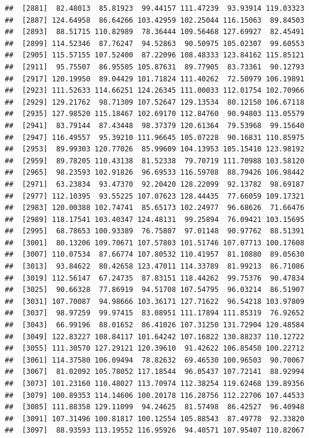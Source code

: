 \documentclass[
]{article}
\begin{document}
\begin{verbatim}
##  [2881]  82.48013  85.81923  99.44157 111.47239  93.93914 119.03323
##  [2887] 124.64958  86.64266 103.42959 102.25044 116.15063  89.84503
##  [2893]  88.51715 110.82989  78.36444 109.56468 127.69927  82.45491
##  [2899] 114.52346  87.76247  94.52863  90.50975 105.02307  99.60553
##  [2905] 115.57155 107.52400  87.22096 108.48333 123.84162 115.85121
##  [2911]  95.75507  86.95505 105.87631  89.77905  83.73361  90.12793
##  [2917] 120.19950  89.04429 101.71824 111.40262  72.50979 106.19891
##  [2923] 111.52633 114.66251 124.26345 111.00033 112.01754 102.70966
##  [2929] 129.21762  98.71309 107.52647 129.13534  80.12150 106.67118
##  [2935] 127.98520 115.18467 102.69170 112.84760  90.94803 113.05579
##  [2941]  83.79144  87.43448  98.37379 120.61364  79.53968  99.15640
##  [2947] 116.49557  95.39210 111.96645 105.07228  90.16831 110.85975
##  [2953]  89.99303 120.77026  85.99609 104.13953 105.15410 123.98192
##  [2959]  89.78205 110.43138  81.52338  79.70719 111.70988 103.58120
##  [2965]  98.23593 102.91826  96.69533 116.59708  88.79426 106.98442
##  [2971]  63.23834  93.47370  92.20420 128.22099  92.13782  98.69187
##  [2977] 112.10395  93.55225 107.07623 128.44435  77.66059 109.17321
##  [2983] 120.00388 102.74741  85.65173 102.24977  96.68626  71.66476
##  [2989] 118.17541 103.40347 124.48131  99.25894  76.09421 103.15695
##  [2995]  68.78653 100.93389  76.75807  97.01148  90.97762  88.51391
##  [3001]  80.13206 109.70671 107.57803 101.51746 107.07713 100.17608
##  [3007] 110.07534  87.66774 107.80532 110.41957  81.10880  89.05630
##  [3013]  93.84622  80.42658 123.47011 114.33789  81.99213  86.71086
##  [3019] 112.56147  67.24735  87.83151 118.44262  99.75376  90.47834
##  [3025]  90.66328  77.86919  94.51708 107.54795  96.03214  86.51907
##  [3031] 107.70087  94.98666 103.36171 127.71622  96.54218 103.97809
##  [3037]  98.97259  99.97415  83.08951 111.17894 111.85319  76.92652
##  [3043]  66.99196  88.01652  86.41026 107.31250 131.72904 120.48584
##  [3049] 122.83227 108.84117 101.64242 107.16822 130.88237 110.12722
##  [3055] 111.30570 127.29121 120.39610  91.42622 106.85450 100.22712
##  [3061] 114.37580 106.09494  78.82632  69.46530 100.96503  90.70067
##  [3067]  81.02092 105.78052 117.18544  96.05437 107.72141  88.92994
##  [3073] 101.23160 110.48027 113.70974 112.38254 119.62468 139.89356
##  [3079] 100.89353 114.14606 100.20178 116.28756 112.22706 107.44533
##  [3085] 111.88358 129.11099  94.24625  81.57498  86.42527  96.40948
##  [3091] 107.31496 100.81817 100.12554 105.88543  87.49778  92.33820
##  [3097]  88.93593 113.19552 116.95926  94.40571 107.95407 110.82067

\end{verbatim}
\end{document}
